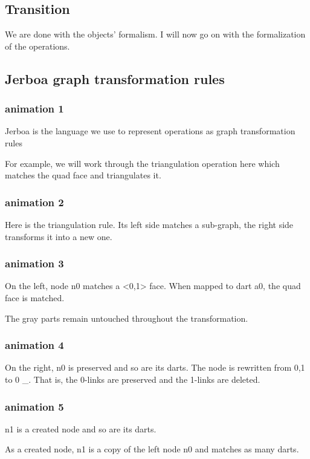 \documentclass[11pt]{article}
\begin{document}
\subsection{Transition}
\label{sec:org85e74b3}
We are done with the objects' formalism. I will now go on with the formalization
of the operations.

\subsection{Jerboa graph transformation rules}
\label{sec:org2f702a7}
\subsubsection{animation 1}
\label{sec:org88cf99e}
Jerboa is the language we use to represent operations as graph transformation
rules

For example, we will work through the triangulation operation here which matches
the quad face and triangulates it.

\subsubsection{animation 2}
\label{sec:org2476c4f}
Here is the triangulation rule.
Its left side matches a sub-graph, the right side transforms it into a new one.

\subsubsection{animation 3}
\label{sec:org6bfbdf0}
On the left, node n0 matches a <0,1> face. When mapped to dart a0, the quad face
is matched.

The gray parts remain untouched throughout the transformation.

\subsubsection{animation 4}
\label{sec:org5003a81}
On the right, n0 is preserved and so are its darts. The node is rewritten from
0,1 to 0 \_. That is, the 0-links are preserved and the 1-links are deleted.

\subsubsection{animation 5}
\label{sec:orgd4ad789}
n1 is a created node and so are its darts.

As a created node, n1 is a copy of the left node n0 and matches as many darts.
\end{document}
